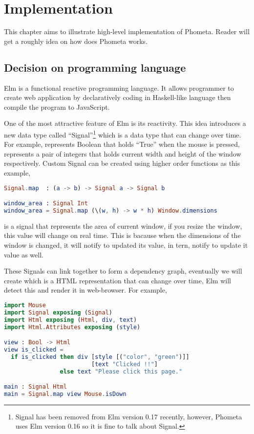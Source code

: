\documentclass[master.tex]{subfiles}
\begin{document}
\chapter{Implementation}
\label{chap:implementation}

This chapter aims to illustrate high-level implementation of Phometa. Reader
will get a roughly idea on how does Phometa works.

\section{Decision on programming language}
Elm\supercite{elm-official-website} is a functional reactive programming
language. It allows programmer to create web application by declaratively coding
in Haskell-like language then compile the program to JavaScript.

One of the most attractive feature of Elm is its reactivity. This idea
introduces a new data type called ``Signal''\footnote{Signal has been removed
  from Elm version 0.17 recently, however, Phometa uses Elm version 0.16 so it
  is fine to talk about Signal.} which is a data type that can change over time.
For example,  represents Boolean that holds
``True'' when the mouse is pressed,  represents a pair of integers that holds current width and height of the
window respectively. Custom Signal can be created using higher order functions
as this example,
\begin{lstlisting}[language=elm]
Signal.map  : (a -> b) -> Signal a -> Signal b

window_area : Signal Int
window_area = Signal.map (\(w, h) -> w * h) Window.dimensions
\end{lstlisting}
 is a signal that represents the area of current window, if
you resize the window, this value will change on real time. This is bacause when
the dimensions of the window is changed, it will notify
 to updated its value,  in
tern, notify  to update it value as well.

These Signals can link together to form a dependency graph, eventually we will
create  which is a HTML representation that can change
over time, Elm will detect this  and render it in web-browser. For
example,

\begin{lstlisting}[language=elm]
import Mouse
import Signal exposing (Signal)
import Html exposing (Html, div, text)
import Html.Attributes exposing (style)

view : Bool -> Html
view is_clicked =
  if is_clicked then div [style [("color", "green")]]
                         [text "Clicked !!"]
                else text "Please click this page."

main : Signal Html
main = Signal.map view Mouse.isDown
\end{lstlisting}
\end{document}
